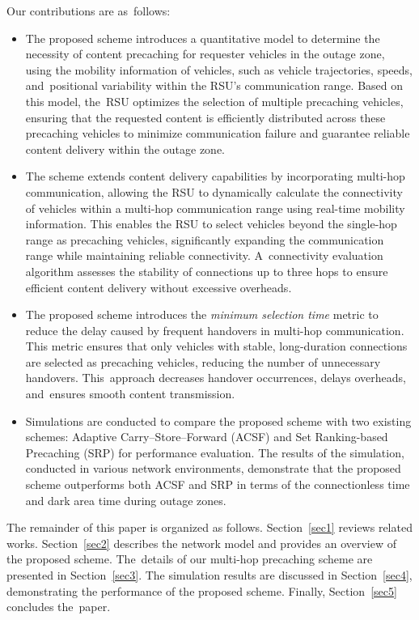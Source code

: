 \documentclass[electronics,aricle,accept,pdftex,moreauthors]{Definitions/mdpi}
\begin{document}
Our contributions are as~follows:
\begin{itemize}
    \item The proposed scheme introduces a quantitative model to determine the necessity of content precaching for requester vehicles in the outage zone, using the mobility information of vehicles, such as vehicle trajectories, speeds, and~positional variability within the RSU’s communication range. Based on this model, the~RSU optimizes the selection of multiple precaching vehicles, ensuring that the requested content is efficiently distributed across these precaching vehicles to minimize communication failure and guarantee reliable content delivery within the outage zone.
    \item The scheme extends content delivery capabilities by incorporating multi-hop communication, allowing the RSU to dynamically calculate the connectivity of vehicles within a multi-hop communication range using real-time mobility information. This enables the RSU to select vehicles beyond the single-hop range as precaching vehicles, significantly expanding the communication range while maintaining reliable connectivity. A~connectivity evaluation algorithm assesses the stability of connections up to three hops to ensure efficient content delivery without excessive overheads.
    \item The proposed scheme introduces the \textit{minimum selection time} metric to reduce the delay caused by frequent handovers in multi-hop communication. This metric ensures that only vehicles with stable, long-duration connections are selected as precaching vehicles, reducing the number of unnecessary handovers. This~approach decreases handover occurrences, delays overheads, and~ensures smooth content transmission.
    \item Simulations are conducted to compare the proposed scheme with two existing schemes: Adaptive Carry--Store--Forward (ACSF) and Set Ranking-based Precaching (SRP) for performance evaluation. The results of the simulation, conducted in various network environments, demonstrate that the proposed scheme outperforms both ACSF and SRP in terms of the connectionless time and dark area time during outage zones.
\end{itemize}

The remainder of this paper is organized as follows. Section~\ref{sec1} reviews related works. Section~\ref{sec2} describes the network model and provides an overview of the proposed scheme. The~details of our multi-hop precaching scheme are presented in Section~\ref{sec3}. The simulation results are discussed in Section~\ref{sec4}, demonstrating the performance of the proposed scheme. Finally, Section~\ref{sec5} concludes the~paper.
\end{document}
